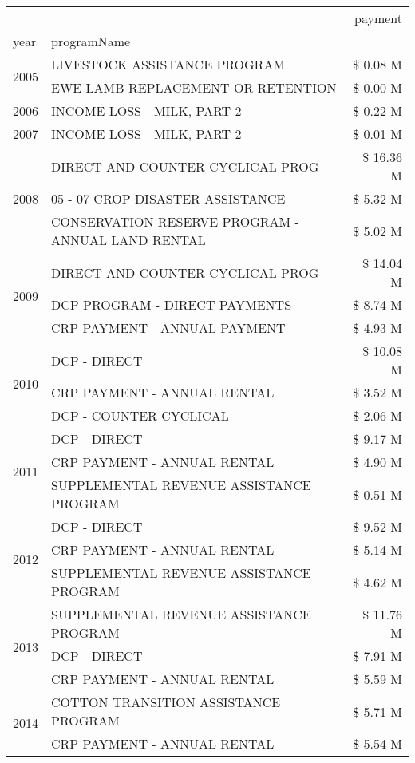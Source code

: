 \begin{tabular}{llr}
\toprule
 &  & payment \\
year & programName &  \\
\midrule
\multirow[t]{2}{*}{2005} & LIVESTOCK ASSISTANCE PROGRAM & \$ 0.08 M \\
 & EWE LAMB REPLACEMENT OR RETENTION & \$ 0.00 M \\
\cline{1-3}
2006 & INCOME LOSS - MILK, PART 2 & \$ 0.22 M \\
\cline{1-3}
2007 & INCOME LOSS - MILK, PART 2 & \$ 0.01 M \\
\cline{1-3}
\multirow[t]{3}{*}{2008} & DIRECT AND COUNTER CYCLICAL PROG & \$ 16.36 M \\
 & 05 - 07 CROP DISASTER ASSISTANCE & \$ 5.32 M \\
 & CONSERVATION RESERVE PROGRAM - ANNUAL LAND RENTAL & \$ 5.02 M \\
\cline{1-3}
\multirow[t]{3}{*}{2009} & DIRECT AND COUNTER CYCLICAL PROG & \$ 14.04 M \\
 & DCP PROGRAM - DIRECT PAYMENTS & \$ 8.74 M \\
 & CRP PAYMENT - ANNUAL PAYMENT & \$ 4.93 M \\
\cline{1-3}
\multirow[t]{3}{*}{2010} & DCP - DIRECT & \$ 10.08 M \\
 & CRP PAYMENT - ANNUAL RENTAL & \$ 3.52 M \\
 & DCP - COUNTER CYCLICAL & \$ 2.06 M \\
\cline{1-3}
\multirow[t]{3}{*}{2011} & DCP - DIRECT & \$ 9.17 M \\
 & CRP PAYMENT - ANNUAL RENTAL & \$ 4.90 M \\
 & SUPPLEMENTAL REVENUE ASSISTANCE PROGRAM & \$ 0.51 M \\
\cline{1-3}
\multirow[t]{3}{*}{2012} & DCP - DIRECT & \$ 9.52 M \\
 & CRP PAYMENT - ANNUAL RENTAL & \$ 5.14 M \\
 & SUPPLEMENTAL REVENUE ASSISTANCE PROGRAM & \$ 4.62 M \\
\cline{1-3}
\multirow[t]{3}{*}{2013} & SUPPLEMENTAL REVENUE ASSISTANCE PROGRAM & \$ 11.76 M \\
 & DCP - DIRECT & \$ 7.91 M \\
 & CRP PAYMENT - ANNUAL RENTAL & \$ 5.59 M \\
\cline{1-3}
\multirow[t]{3}{*}{2014} & COTTON TRANSITION ASSISTANCE PROGRAM & \$ 5.71 M \\
 & CRP PAYMENT - ANNUAL RENTAL & \$ 5.54 M \\

\end{tabular}

